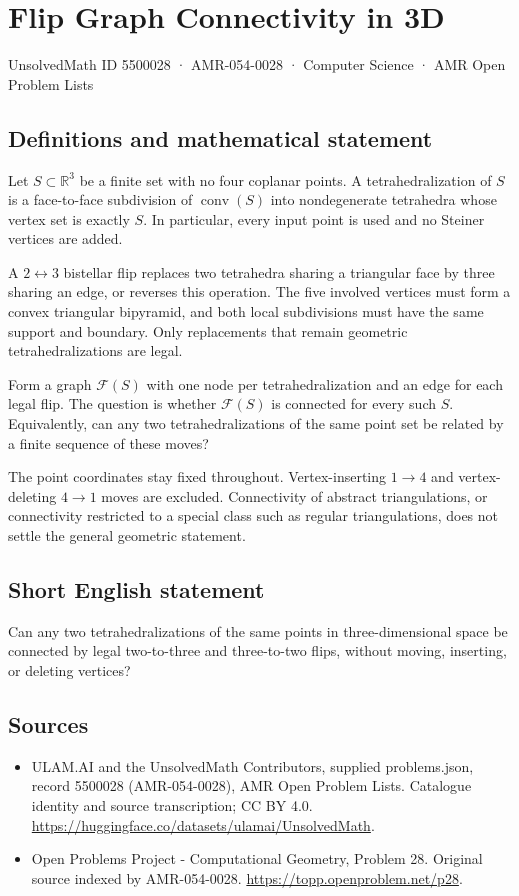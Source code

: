 \documentclass[11pt,a4paper]{article}
\begin{document}
\section*{Flip Graph Connectivity in 3D}\label{5500028}
{\small UnsolvedMath ID 5500028 · AMR-054-0028 · Computer Science · AMR Open Problem Lists}
\subsection{Definitions and mathematical statement}
Let $S\subset\mathbb R^3$ be a finite set with no four coplanar points.
A tetrahedralization of $S$ is a face-to-face subdivision of
$\operatorname{conv}(S)$ into nondegenerate tetrahedra whose vertex set
is exactly $S$. In particular, every input point is used and no
Steiner vertices are added.

A $2\leftrightarrow3$ bistellar flip replaces two tetrahedra sharing
a triangular face by three sharing an edge, or reverses this operation.
The five involved vertices must form a convex triangular bipyramid,
and both local subdivisions must have the same support and boundary.
Only replacements that remain geometric tetrahedralizations are legal.

Form a graph $\mathcal F(S)$ with one node per tetrahedralization and
an edge for each legal flip. The question is whether $\mathcal F(S)$
is connected for every such $S$. Equivalently, can any two
tetrahedralizations of the same point set be related by a finite
sequence of these moves?

The point coordinates stay fixed throughout. Vertex-inserting
$1\to4$ and vertex-deleting $4\to1$ moves are excluded. Connectivity
of abstract triangulations, or connectivity restricted to a special
class such as regular triangulations, does not settle the general
geometric statement.
\subsection{Short English statement}
Can any two tetrahedralizations of the same points in three-dimensional
space be connected by legal two-to-three and three-to-two flips, without
moving, inserting, or deleting vertices?
\subsection{Sources}
\begin{itemize}
\item[S1] ULAM.AI and the UnsolvedMath Contributors, supplied problems.json, record 5500028 (AMR-054-0028), AMR Open Problem Lists. Catalogue identity and source transcription; CC BY 4.0.
\url{https://huggingface.co/datasets/ulamai/UnsolvedMath}.
\item[S2] Open Problems Project - Computational Geometry, Problem 28. Original source indexed by AMR-054-0028.
\url{https://topp.openproblem.net/p28}.
\end{itemize}
\end{document}

